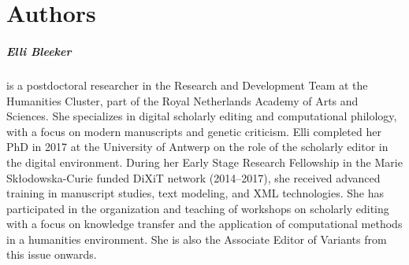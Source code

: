\pagestyle{authors}
\chapter*{Authors}
\protect\thispagestyle{plain.authors}



\paragraph{Elli Bleeker} is a postdoctoral researcher in the Research and Development Team at the Humanities Cluster, part of the Royal Netherlands Academy of Arts and Sciences. She specializes in digital scholarly editing and computational philology, with a focus on modern manuscripts and genetic criticism. Elli completed her PhD in 2017 at the University of Antwerp on the role of the scholarly editor in the digital environment. During her Early Stage Research Fellowship in the Marie Skłodowska-Curie funded DiXiT network (2014–2017), she received advanced training in manuscript studies, text modeling, and XML technologies. She has participated in the organization and teaching of workshops on scholarly editing with a focus on knowledge transfer and the application of computational methods in a humanities environment. She is also the Associate Editor of Variants from this issue onwards.

